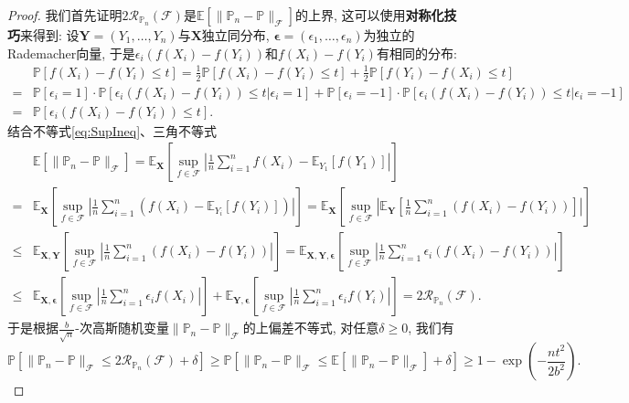 \begin{proof}
	我们首先证明$2 \mathcal{R}_{\mathbb{P}_n}(\mathscr{F})$是$\mathbb{E} \left[ \|\mathbb{P}_n - \mathbb{P}\|_{\mathscr{F}} \right]$的上界, 这可以使用\textbf{对称化技巧}来得到: 
	设$\bm{Y} = (Y_1, \dots, Y_n)$与$\bm{X}$独立同分布, $\bm{\epsilon} = (\epsilon_1, \dots, \epsilon_n)$为独立的Rademacher向量, 于是$\epsilon_i (f(X_i) - f(Y_i))$和$f(X_i) - f(Y_i)$有相同的分布: 
	\begin{align*}
		&\mathbb{P}[f(X_i) - f(Y_i) \leq t] 
		= \frac{1}{2} \mathbb{P}[f(X_i) - f(Y_i) \leq t] + \frac{1}{2} \mathbb{P}[f(Y_i) - f(X_i) \leq t] \\
		=& \mathbb{P}[\epsilon_i = 1] \cdot \mathbb{P}[\epsilon_i(f(X_i) - f(Y_i)) \leq t | \epsilon_i = 1] + \mathbb{P}[\epsilon_i = -1] \cdot  \mathbb{P}[\epsilon_i(f(X_i) - f(Y_i)) \leq t | \epsilon_i = -1] \\
		=& \mathbb{P}[\epsilon_i (f(X_i) - f(Y_i)) \leq t]. 
	\end{align*} 
	结合不等式\eqref{eq:SupIneq}、三角不等式
	\begin{align*}
		& \mathbb{E} \left[ \|\mathbb{P}_n - \mathbb{P}\|_{\mathscr{F}} \right]
		= \mathbb{E}_{\bm{X}} \left[ \sup_{f \in \mathscr{F}} \left| \frac{1}{n} \sum_{i = 1}^n f(X_i) - \mathbb{E}_{Y_1} [f(Y_1)] \right| \right]\\
		= & \mathbb{E}_{\bm{X}} \left[ \sup_{f \in \mathscr{F}} \left| \frac{1}{n} \sum_{i=1}^n \left( f(X_i) - \mathbb{E}_{Y_i} [f(Y_i)] \right) \right| \right] 
		= \mathbb{E}_{\bm{X}} \left[ \sup_{f \in \mathscr{F}} \left| \mathbb{E}_{\bm{Y}} \left[ \frac{1}{n} \sum_{i=1}^n \left( f(X_i) - f(Y_i) \right) \right] \right| \right] \\
		\leq & \mathbb{E}_{\bm{X}, \bm{Y}} \left[ \sup_{f \in \mathscr{F}} \left|  \frac{1}{n} \sum_{i=1}^n \left( f(X_i) - f(Y_i) \right) \right| \right]
		=  \mathbb{E}_{\bm{X}, \bm{Y}, \bm{\epsilon}} \left[ \sup_{f \in \mathscr{F}} \left|  \frac{1}{n} \sum_{i=1}^n \epsilon_i \left( f(X_i) - f(Y_i) \right) \right| \right] \\
		\leq & \mathbb{E}_{\bm{X}, \bm{\epsilon}}  \left[ \sup_{f \in \mathscr{F}} \left|  \frac{1}{n} \sum_{i=1}^n \epsilon_i f(X_i) \right| \right] + \mathbb{E}_{\bm{Y}, \bm{\epsilon}}  \left[ \sup_{f \in \mathscr{F}} \left|  \frac{1}{n} \sum_{i=1}^n \epsilon_i f(Y_i) \right| \right]
		= 2 \mathcal{R}_{\mathbb{P}_n}(\mathscr{F}). 
	\end{align*}
	于是根据$\frac{b}{\sqrt{n}}$-次高斯随机变量$\|\mathbb{P}_n - \mathbb{P}\|_{\mathscr{F}}$的上偏差不等式, 对任意$\delta \geq 0$, 我们有
	\begin{equation*}
		\mathbb{P} \left[ \|\mathbb{P}_n - \mathbb{P}\|_{\mathscr{F}} \leq 2 \mathcal{R}_{\mathbb{P}_n}(\mathscr{F}) + \delta \right]
		\geq  \mathbb{P} \left[ \|\mathbb{P}_n - \mathbb{P}\|_{\mathscr{F}} \leq \mathbb{E} \left[ \|\mathbb{P}_n - \mathbb{P}\|_{\mathscr{F}} \right] + \delta \right] 
		\geq 1 - \exp\left( - \frac{n t^2}{2 b^2} \right). 
	\end{equation*}
\end{proof}

